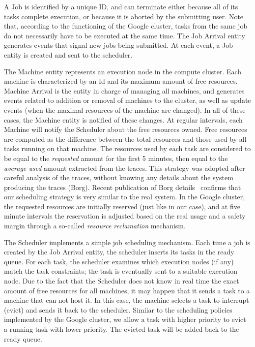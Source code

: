 \documentclass{article}
\begin{document}
A Job is identified by a unique ID, and can terminate either because all of its tasks complete execution, or because it is aborted by the submitting user. Note that, according to the functioning of the Google cluster, tasks from the same job do not necessarily have to be executed at the same time. The Job Arrival entity generates events that signal new jobs being submitted. At each event, a Job entity is created and sent to the scheduler.

The Machine entity represents an execution node in the compute cluster. Each machine is characterized by an Id and its maximum amount of free resources. Machine Arrival is the entity in charge of managing all machines, and generates events related to addition or removal of machines to the cluster, as well as update events (when the maximal resources of the machine are changed). In all of these cases, the Machine entity is notified of these changes. At regular intervals, each Machine will notify the Scheduler about the free resources owned. Free resources are computed as the difference between the total resources and those used by all tasks running on that machine. The resources used by each task are considered to be equal to the \emph{requested} amount for the first 5 minutes, then equal to the \emph{average used} amount extracted from the traces. This strategy was adopted after careful analysis of the traces, without knowing any details about the system producing the traces (Borg). Recent publication of Borg details~\cite{verma2015} confirms that our scheduling strategy is very similar to the real system. In the Google cluster, the requested resources are initially reserved (just like in our case), and at five minute intervals the reservation is adjusted based on the real usage and a safety margin through a so-called \emph{resource reclamation} mechanism.

The Scheduler implements a simple job scheduling mechanism. Each time a job is created by the Job Arrival entity, the scheduler inserts its tasks in the ready queue. For each task, the scheduler examines which execution nodes (if any) match the task constraints; the task is eventually sent to a suitable execution node. Due to the fact that the Scheduler does not know in real time the exact amount of free resources for all machines, it may happen that it sends a task to a machine that can not host it. In this case, the machine selects a task to interrupt (evict) and sends it back to the scheduler. Similar to the scheduling policies implemented by the Google cluster, we allow a task with higher priority to evict a running task with lower priority. The evicted task will be added back to the ready queue.
\end{document}
